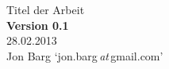 \begin{titlepage}
	\vspace*{7cm}
	\begin{center}
		\Huge
		Titel der Arbeit\\
		\vspace{1cm}
		\large
		\textbf{Version 0.1}\\
		28.02.2013\\
		\vspace{2cm}
		Jon Barg \enquote*{jon.barg\,\emph{at}\,gmail.com}\\
	\end{center}
	\normalsize
	\vfill
	
	
\end{titlepage}





%
%
